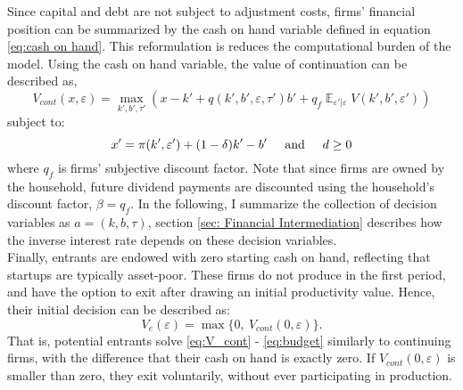\documentclass[12pt]{article}
\DeclareMathOperator{\E}{\mathbb{E}}
\begin{document}
Since capital and debt are not subject to adjustment costs, firms' financial position can be summarized by the cash on hand variable defined in equation \ref{eq:cash on hand}. This reformulation is reduces the computational burden of the model. Using the cash on hand variable, the value of continuation can be described as,
\begin{equation} \label{eq:V_cont}
    V_{cont}(x,\varepsilon) = \max_{k',b', \tau'} \left(x - k' +  q(k',b',\varepsilon, \tau')b' + q_f \E_{\varepsilon'|\varepsilon} V(k',b', \varepsilon') \right)
\end{equation}
subject to: 
\begin{equation} \label{eq:budget}
x' = \pi(k',\varepsilon')+(1-\delta)k'-b' \hspace{5mm} \text{and} \hspace{5mm} d \geq 0
\end{equation} 
where $q_f$ is firms' subjective discount factor. Note that since firms are owned by the household, future dividend payments are discounted using the household's discount factor, $\beta = q_f$. In the following, I summarize the collection of decision variables as $a = (k, b, \tau) $, section \ref{sec: Financial Intermediation} describes how the inverse interest rate depends on these decision variables.  \vspace{3mm} \\
Finally, entrants are endowed with zero starting cash on hand, reflecting that startups are typically asset-poor. These firms do not produce in the first period, and have the option to exit after drawing an initial productivity value. Hence, their initial decision can be described as: 
\begin{equation} \label{eq:entrant decision}
    V_e(\varepsilon) = \max \{0,  \ V_{cont}(0,\varepsilon) \}.
\end{equation}
That is, potential entrants solve \ref{eq:V_cont} - \ref{eq:budget} similarly to continuing firms, with the difference that their cash on hand is exactly zero. If $V_{cont}(0,\varepsilon)$ is smaller than zero, they exit voluntarily, without ever participating in production.
\end{document}
